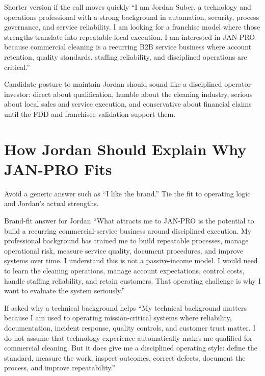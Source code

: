 \documentclass[11pt]{article}
\newcommand{\janpro}{JAN-PRO}
\begin{document}
\begin{scriptbox}{Shorter version if the call moves quickly}
``I am Jordan Suber, a technology and operations professional with a strong background in automation, security, process governance, and service reliability. I am looking for a franchise model where those strengths translate into repeatable local execution. I am interested in \janpro{} because commercial cleaning is a recurring B2B service business where account retention, quality standards, staffing reliability, and disciplined operations are critical.''
\end{scriptbox}

\begin{greenbox}{Candidate posture to maintain}
Jordan should sound like a disciplined operator-investor: direct about qualification, humble about the cleaning industry, serious about local sales and service execution, and conservative about financial claims until the FDD and franchisee validation support them.
\end{greenbox}

\section{How Jordan Should Explain Why \janpro{} Fits}

Avoid a generic answer such as ``I like the brand.'' Tie the fit to operating logic and Jordan's actual strengths.

\begin{scriptbox}{Brand-fit answer for Jordan}
``What attracts me to \janpro{} is the potential to build a recurring commercial-service business around disciplined execution. My professional background has trained me to build repeatable processes, manage operational risk, measure service quality, document procedures, and improve systems over time. I understand this is not a passive-income model. I would need to learn the cleaning operations, manage account expectations, control costs, handle staffing reliability, and retain customers. That operating challenge is why I want to evaluate the system seriously.''
\end{scriptbox}

\begin{scriptbox}{If asked why a technical background helps}
``My technical background matters because I am used to operating mission-critical systems where reliability, documentation, incident response, quality controls, and customer trust matter. I do not assume that technology experience automatically makes me qualified for commercial cleaning. But it does give me a disciplined operating style: define the standard, measure the work, inspect outcomes, correct defects, document the process, and improve repeatability.''
\end{scriptbox}
\end{document}
